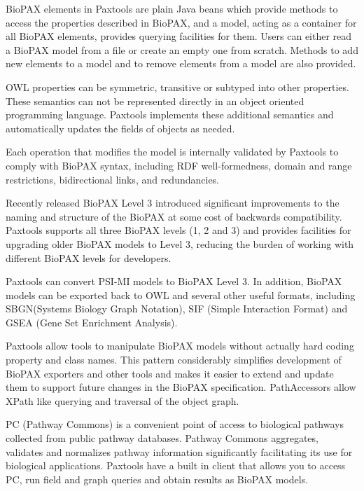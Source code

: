 \documentclass{tufte-book}
\begin{document}
 BioPAX elements in Paxtools are plain Java beans which provide methods to access the properties described in BioPAX, and a model, acting as a container for all BioPAX elements, provides querying facilities for them. Users can either read a BioPAX model from a file or create an empty one from scratch. Methods to add new elements to a model and to remove elements from a model are also provided.

 OWL properties can be symmetric, transitive or subtyped into other properties. These semantics can not be represented directly in an object oriented programming language. Paxtools implements these additional semantics and automatically updates the fields of objects as needed.

 Each operation that modifies the model is internally validated by Paxtools to comply with BioPAX syntax, including RDF well-formedness, domain and range restrictions, bidirectional links, and redundancies.

 Recently released BioPAX Level 3 introduced significant improvements to the naming and structure of the BioPAX at some cost of backwards compatibility. Paxtools supports all three BioPAX levels (1, 2 and 3) and provides facilities for upgrading older BioPAX models to Level 3, reducing the burden of working with different BioPAX levels for developers.

 Paxtools can convert PSI-MI\cite{Kerrien2007} models to BioPAX Level 3. In addition, BioPAX models can be exported back to OWL and several other useful formats, including  SBGN(Systems Biology Graph Notation)\cite{Le_Novère2009}, SIF (Simple Interaction Format) and GSEA (Gene Set Enrichment Analysis)\cite{Subramanian2005}.

 Paxtools allow tools to manipulate BioPAX models without actually hard coding property and class names. This pattern considerably simplifies development of BioPAX exporters and other tools and makes it easier to extend and update them to support future changes in the BioPAX specification. PathAccessors allow XPath like querying and traversal of the object graph. 

 PC (Pathway Commons)\cite{Cerami2011} is a convenient point of access to biological pathways collected from public pathway databases. Pathway Commons aggregates, validates and normalizes pathway information significantly facilitating its use for biological applications. Paxtools have a built in client that allows you to access PC, run field and graph queries and obtain results as BioPAX models. 
\end{document}
